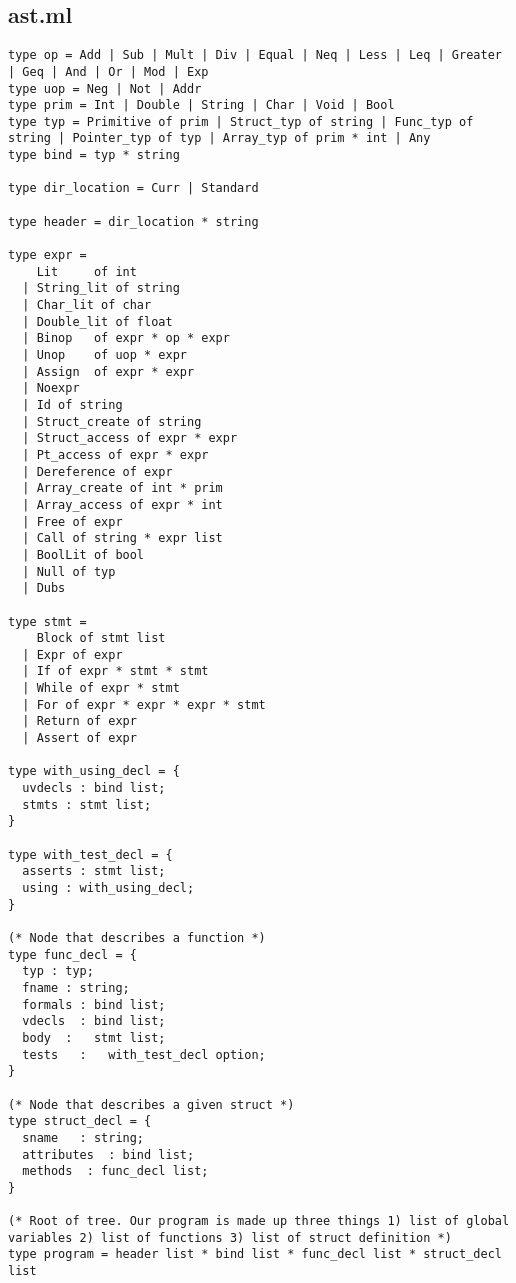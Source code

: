 \documentclass{article}
\begin{document}
\subsection{ast.ml}
\begin{lstlisting}
type op = Add | Sub | Mult | Div | Equal | Neq | Less | Leq | Greater | Geq | And | Or | Mod | Exp
type uop = Neg | Not | Addr
type prim = Int | Double | String | Char | Void | Bool
type typ = Primitive of prim | Struct_typ of string | Func_typ of string | Pointer_typ of typ | Array_typ of prim * int | Any 
type bind = typ * string

type dir_location = Curr | Standard

type header = dir_location * string

type expr =
    Lit     of int
  | String_lit of string
  | Char_lit of char
  | Double_lit of float
  | Binop   of expr * op * expr
  | Unop    of uop * expr
  | Assign  of expr * expr
  | Noexpr
  | Id of string
  | Struct_create of string
  | Struct_access of expr * expr
  | Pt_access of expr * expr 
  | Dereference of expr
  | Array_create of int * prim
  | Array_access of expr * int
  | Free of expr
  | Call of string * expr list
  | BoolLit of bool
  | Null of typ
  | Dubs 

type stmt =
    Block of stmt list   
  | Expr of expr
  | If of expr * stmt * stmt
  | While of expr * stmt
  | For of expr * expr * expr * stmt
  | Return of expr
  | Assert of expr

type with_using_decl = {
  uvdecls : bind list;
  stmts : stmt list;
}

type with_test_decl = {
  asserts : stmt list;
  using : with_using_decl; 
}

(* Node that describes a function *)
type func_decl = {
  typ : typ;
  fname : string;
  formals : bind list;
  vdecls  : bind list;
  body  :   stmt list;
  tests   :   with_test_decl option; 
}

(* Node that describes a given struct *)
type struct_decl = {
  sname   : string;
  attributes  : bind list;
  methods  : func_decl list;
}

(* Root of tree. Our program is made up three things 1) list of global variables 2) list of functions 3) list of struct definition *)
type program = header list * bind list * func_decl list * struct_decl list
\end{lstlisting}
\newpage
\end{document}
